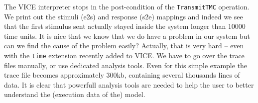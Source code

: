 The VICE interpreter stops in the post-condition of the \verb+TransmitTMC+
operation. We print out the stimuli (e2s) and response (s2e) mappings and
indeed we see that the first stimulus sent actually stayed inside the
system longer than 10000 time units. It is nice that we know that we do
have a problem in our system but can we find the cause of the problem
easily? Actually, that is very hard -- even with the \verb+time+ extension
recently added to VICE. We have to go over the trace files manually, or
use dedicated analysis tools. Even for this simple example the trace file
becomes approximately 300kb, containing several thousands lines of data.
It is clear that powerfull analysis tools are needed to help the user
to better understand the (execution data of the) model.

